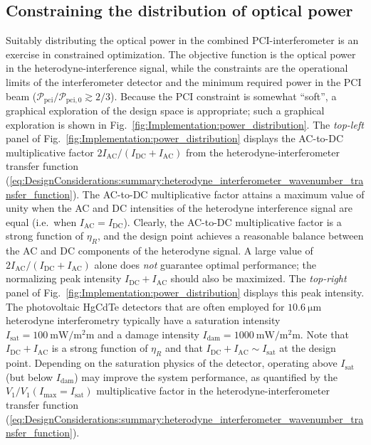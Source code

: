 \subsection{Constraining the distribution of optical power}
Suitably distributing the optical power in the combined PCI-interferometer
is an exercise in constrained optimization.
The objective function is the optical power
in the heterodyne-interference signal, while the constraints are
the operational limits of the interferometer detector and
the minimum required power in the PCI beam
($\mathcal{P}_{\text{pci}} / \mathcal{P}_{\text{pci},0} \gtrsim 2 / 3$).
Because the PCI constraint is somewhat ``soft'',
a graphical exploration of the design space is appropriate;
such a graphical exploration is shown in
Fig.~\ref{fig:Implementation:power_distribution}.
The \emph{top-left} panel of
Fig.~\ref{fig:Implementation:power_distribution}
displays the AC-to-DC multiplicative factor
$2 I_{\text{AC}} / (I_{\text{DC}} + I_{\text{AC}})$
from the heterodyne-interferometer transfer function
(\ref{eq:DesignConsiderations:summary:heterodyne_interferometer_wavenumber_transfer_function}).
The AC-to-DC multiplicative factor attains a maximum value of unity when
the AC and DC intensities of the heterodyne interference signal are equal
(i.e.\ when $I_{\text{AC}} = I_{\text{DC}}$).
Clearly, the AC-to-DC multiplicative factor
is a strong function of $\eta_R$, and
the design point achieves a reasonable balance
between the AC and DC components of the heterodyne signal.
A large value of $2 I_{\text{AC}} / (I_{\text{DC}} + I_{\text{AC}})$ alone
does \emph{not} guarantee optimal performance;
the normalizing peak intensity $I_{\text{DC}} + I_{\text{AC}}$
should also be maximized.
The \emph{top-right} panel of
Fig.~\ref{fig:Implementation:power_distribution}
displays this peak intensity.
The photovoltaic HgCdTe detectors that are often employed
for $\SI{10.6}{\micro\meter}$ heterodyne interferometry typically have
a saturation intensity
$I_{\text{sat}} = \SI{100}{\milli\watt\per\square\milli\meter}$
and a damage intensity
$I_{\text{dam}} = \SI{1000}{\milli\watt\per\square\milli\meter}$.
Note that $I_{\text{DC}} + I_{\text{AC}}$
is a strong function of $\eta_R$
and that $I_{\text{DC}} + I_{\text{AC}} \sim I_{\text{sat}}$
at the design point.
Depending on the saturation physics of the detector,
operating above $I_{\text{sat}}$ (but below $I_{\text{dam}}$)
may improve the system performance, as quantified by the
$V_1 / V_1(I_{\text{max}} = I_{\text{sat}})$ multiplicative factor
in the heterodyne-interferometer transfer function
(\ref{eq:DesignConsiderations:summary:heterodyne_interferometer_wavenumber_transfer_function}).
